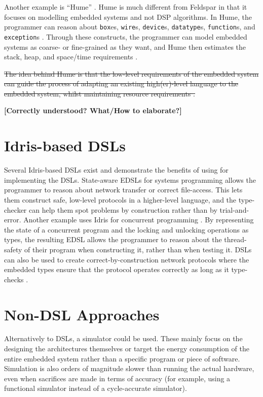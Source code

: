 	Another example is ``Hume'' \cite{10.1007/978-3-540-39815-8_3}. Hume is much different from Feldspar in that it focuses on modelling embedded systems and not DSP algorithms. In Hume, the programmer can reason about \texttt{box}es, \texttt{wire}s, \texttt{device}s, \texttt{datatype}s, \texttt{function}s, and \texttt{exception}s \cite{10.1007/978-3-540-39815-8_3}. Through these constructs, the programmer can model embedded systems as coarse- or fine-grained as they want, and Hume then estimates the stack, heap, and space/time requirements \cite{10.1007/978-3-540-39815-8_3}.
    
    \sout{The idea behind Hume is that the low-level requirements of the embedded system can guide the process of adapting an existing high(er)-level language to the embedded system, whilst maintaining resource requirements \cite{10.1007/978-3-540-39815-8_3}.}
    
    \textbf{[Correctly understood? What/How to elaborate?]}

\section{Idris-based DSLs}
	Several Idris-based DSLs exist and demonstrate the benefits of using \Idris for implementing the DSLs. State-aware EDSLs for systems programming \cite{10.1007/978-3-642-27694-1_18} allows the programmer to reason about network transfer or correct file-access. This lets them construct safe, low-level protocols in a higher-level language, and the type-checker can help them spot problems by construction \cite{10.1007/978-3-642-27694-1_18} rather than by trial-and-error.
	Another example uses Idris for concurrent programming \cite{brady2010correct}. By representing the state of a concurrent program and the locking and unlocking operations as types, the resulting EDSL allows the programmer to reason about the thread-safety of their program when constructing it, rather than when testing it.
	DSLs can also be used to create correct-by-construction network protocols where the embedded types ensure that the protocol operates correctly as long as it type-checks \cite{5158855}.

\section{Non-DSL Approaches}
	Alternatively to DSLs, a simulator could be used. These mainly focus on the designing the architectures themselves \cite{10.1007/3-540-46002-0_32,Lee:2008:FFC:1375657.1375670} or target the energy consumption of the entire embedded system \cite{782199} rather than a specific program or piece of software. Simulation is also orders of magnitude slower than running the actual hardware, even when sacrifices are made in terms of accuracy (for example, using a functional simulator instead of a cycle-accurate simulator).

